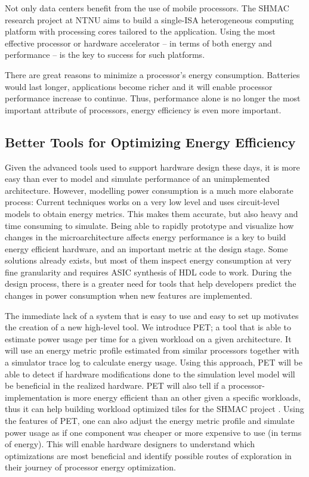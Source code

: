 Not only data centers benefit from the use of mobile processors. The SHMAC
research project at NTNU aims to build a single-ISA heterogeneous computing
platform with processing cores tailored to the application. Using the most
effective processor or hardware accelerator -- in terms of both energy
and performance -- is the key to success for such platforms.

There are great reasons to minimize a processor's energy consumption. Batteries
would last longer, applications become richer and it will enable processor
performance increase to continue. Thus, performance alone is no longer the most
important attribute of processors, energy efficiency is even more important.


\subsection{Better Tools for Optimizing Energy Efficiency}

Given the advanced tools used to support hardware design these days, it is more
easy than ever to model and simulate performance of an unimplemented
architecture. However, modelling power consumption is a much more elaborate
process: Current techniques works on a very low level and uses circuit-level
models to obtain energy metrics. This makes them accurate, but also heavy and
time consuming to simulate. Being able to rapidly prototype and visualize how
changes in the microarchitecture affects energy performance is a key to build
energy efficient hardware, and an important metric at the design stage. Some
solutions already exists, but most of them inspect energy consumption at very
fine granularity and requires ASIC synthesis of HDL code to work. During the
design process, there is a greater need for tools that help developers predict
the changes in power consumption when new features are implemented.

The immediate lack of a system that is easy to use and easy to set up motivates
the creation of a new high-level tool. We introduce PET; a tool that is able to
estimate power usage per time for a given workload on a given architecture. It
will use an energy metric profile estimated from similar processors together
with a simulator trace log to calculate energy usage. Using this approach, PET
will be able to detect if hardware modifications done to the simulation level
model will be beneficial in the realized hardware. PET will also tell if a
processor-implementation is more energy efficient than an other given a specific
workloads, thus it can help building workload optimized tiles for the SHMAC
project \cite{shmacwebpage}. Using the features of PET, one can also adjust the
energy metric profile and simulate power usage as if one component was cheaper
or more expensive to use (in terms of energy). This will enable hardware designers to
understand which optimizations are most beneficial and identify possible routes
of exploration in their journey of processor energy optimization.


